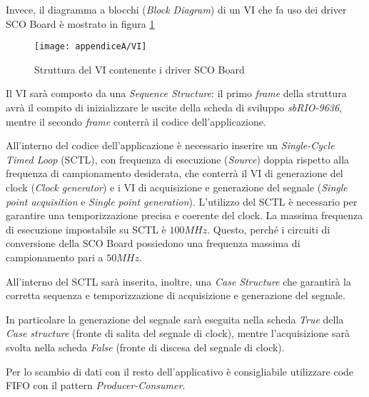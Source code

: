 Invece, il diagramma a blocchi (\textit{Block Diagram}) di un VI che fa uso dei driver SCO Board è mostrato in figura \ref{VI}

\begin{figure}[H]
	\begin{center}
		\texttt{[image: appendiceA/VI]}
		\caption{Struttura del VI contenente i driver SCO Board}
		\label{VI}
	\end{center}
\end{figure}

Il VI sarà composto da una \textit{Sequence Structure}: il primo \textit{frame} della struttura avrà il compito di inizializzare le uscite della scheda di sviluppo \textit{sbRIO-9636}, mentre il secondo \textit{frame} conterrà il codice dell'applicazione.

All'interno del codice dell'applicazione è necessario inserire un \textit{Single-Cycle Timed Loop} (SCTL), con frequenza di esecuzione (\textit{Source}) doppia rispetto alla frequenza di campionamento desiderata, che conterrà il VI di generazione del clock (\textit{Clock generator}) e i VI di acquisizione e generazione del segnale (\textit{Single point acquisition} e \textit{Single point generation}). L'utilizzo del SCTL è necessario per garantire una temporizzazione precisa e coerente del clock. La massima frequenza di esecuzione impostabile su SCTL è $100MHz$. Questo, perché i circuiti di conversione della SCO Board possiedono una frequenza massima di campionamento pari a $50MHz$.

All'interno del SCTL sarà inserita, inoltre, una \textit{Case Structure} che garantirà la corretta sequenza e temporizzazione di acquisizione e generazione del segnale. 

In particolare la generazione del segnale sarà eseguita nella scheda \textit{True} della \textit{Case structure} (fronte di salita del segnale di clock), mentre l'acquisizione sarà svolta nella scheda \textit{False} (fronte di discesa del segnale di clock).

Per lo scambio di dati con il resto dell'applicativo è consigliabile utilizzare code FIFO con il pattern \textit{Producer-Consumer}.




